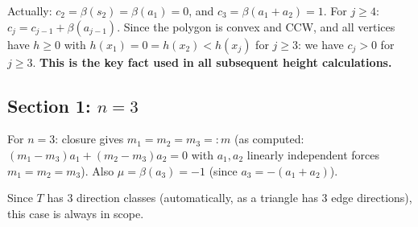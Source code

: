 Actually: $c_2 = \beta(s_2) = \beta(a_1) = 0$, and $c_3 = \beta(a_1+a_2) = 1$.
For $j \geq 4$: $c_j = c_{j-1} + \beta(a_{j-1})$.  Since the polygon is convex and CCW,
and all vertices have $h \geq 0$ with $h(x_1) = 0 = h(x_2) < h(x_j)$ for $j \geq 3$:
we have $c_j > 0$ for $j \geq 3$.  \textbf{This is the key fact used in all subsequent
height calculations.}

\bigskip

\subsection*{Section 1: $n = 3$}

For $n=3$: closure gives $m_1 = m_2 = m_3 =: m$ (as computed: $(m_1-m_3)a_1 + (m_2-m_3)a_2 = 0$ with $a_1,a_2$ linearly independent forces $m_1=m_2=m_3$).
Also $\mu = \beta(a_3) = -1$ (since $a_3 = -(a_1+a_2)$).

Since $T$ has $3$ direction classes (automatically, as a triangle has $3$ edge directions),
this case is always in scope.


